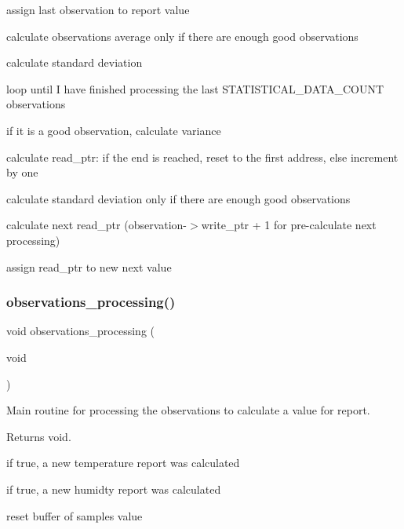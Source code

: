 assign last observation to report value

calculate observations average only if there are enough good observations

calculate standard deviation

loop until I have finished processing the last S\+T\+A\+T\+I\+S\+T\+I\+C\+A\+L\+\_\+\+D\+A\+T\+A\+\_\+\+C\+O\+U\+NT observations

if it is a good observation, calculate variance

calculate read\+\_\+ptr\+: if the end is reached, reset to the first address, else increment by one

calculate standard deviation only if there are enough good observations

calculate next read\+\_\+ptr (observation-\/$>$write\+\_\+ptr + 1 for pre-\/calculate next processing)

assign read\+\_\+ptr to new next value \mbox{\label{i2c-th_8h_a8b67eda853f3e8cca0c729267b492861}} 
\subsubsection{\texorpdfstring{observations\+\_\+processing()}{observations\_processing()}}
{\footnotesize\ttfamily void observations\+\_\+processing (\begin{DoxyParamCaption}\item[{void}]{ }\end{DoxyParamCaption})}



Main routine for processing the observations to calculate a value for report. 

\begin{DoxyReturn}{Returns}
void. 
\end{DoxyReturn}
if true, a new temperature report was calculated

if true, a new humidty report was calculated

reset buffer of samples value \mbox{\label{i2c-th_8h_ab08b9047f47849f399950705e769be2e}} 
